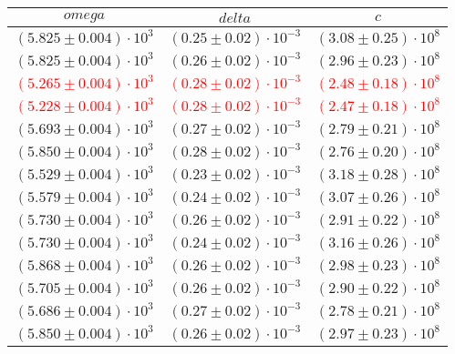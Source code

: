 \begin{table}[H]
    \centering
        \begin{tabular}{|c|c|c|}
        \hline
        $ omega $ & $ delta $ & $ c $\\
        \hline
        $ (5.825 \pm 0.004) \cdot 10^{3} $ & $ (0.25 \pm 0.02) \cdot 10^{-3} $ & $ (3.08 \pm 0.25) \cdot 10^{8} $\\
        \hline
        $ (5.825 \pm 0.004) \cdot 10^{3} $ & $ (0.26 \pm 0.02) \cdot 10^{-3} $ & $ (2.96 \pm 0.23) \cdot 10^{8} $\\
        \hline
        \textcolor{red}{$ (5.265 \pm 0.004) \cdot 10^{3} $} & \textcolor{red}{$ (0.28 \pm 0.02) \cdot 10^{-3} $} & \textcolor{red}{$ (2.48 \pm 0.18) \cdot 10^{8} $}\\
        \hline
        \textcolor{red}{$ (5.228 \pm 0.004) \cdot 10^{3} $} & \textcolor{red}{$ (0.28 \pm 0.02) \cdot 10^{-3} $} & \textcolor{red}{$ (2.47 \pm 0.18) \cdot 10^{8} $}\\
        \hline
        $ (5.693 \pm 0.004) \cdot 10^{3} $ & $ (0.27 \pm 0.02) \cdot 10^{-3} $ & $ (2.79 \pm 0.21) \cdot 10^{8} $\\
        \hline
        $ (5.850 \pm 0.004) \cdot 10^{3} $ & $ (0.28 \pm 0.02) \cdot 10^{-3} $ & $ (2.76 \pm 0.20) \cdot 10^{8} $\\
        \hline
        $ (5.529 \pm 0.004) \cdot 10^{3} $ & $ (0.23 \pm 0.02) \cdot 10^{-3} $ & $ (3.18 \pm 0.28) \cdot 10^{8} $\\
        \hline
        $ (5.579 \pm 0.004) \cdot 10^{3} $ & $ (0.24 \pm 0.02) \cdot 10^{-3} $ & $ (3.07 \pm 0.26) \cdot 10^{8} $\\
        \hline
        $ (5.730 \pm 0.004) \cdot 10^{3} $ & $ (0.26 \pm 0.02) \cdot 10^{-3} $ & $ (2.91 \pm 0.22) \cdot 10^{8} $\\
        \hline
        $ (5.730 \pm 0.004) \cdot 10^{3} $ & $ (0.24 \pm 0.02) \cdot 10^{-3} $ & $ (3.16 \pm 0.26) \cdot 10^{8} $\\
        \hline
        $ (5.868 \pm 0.004) \cdot 10^{3} $ & $ (0.26 \pm 0.02) \cdot 10^{-3} $ & $ (2.98 \pm 0.23) \cdot 10^{8} $\\
        \hline
        $ (5.705 \pm 0.004) \cdot 10^{3} $ & $ (0.26 \pm 0.02) \cdot 10^{-3} $ & $ (2.90 \pm 0.22) \cdot 10^{8} $\\
        \hline
        $ (5.686 \pm 0.004) \cdot 10^{3} $ & $ (0.27 \pm 0.02) \cdot 10^{-3} $ & $ (2.78 \pm 0.21) \cdot 10^{8} $\\
        \hline
        $ (5.850 \pm 0.004) \cdot 10^{3} $ & $ (0.26 \pm 0.02) \cdot 10^{-3} $ & $ (2.97 \pm 0.23) \cdot 10^{8} $\\

\end{tabular}
\end{table}
